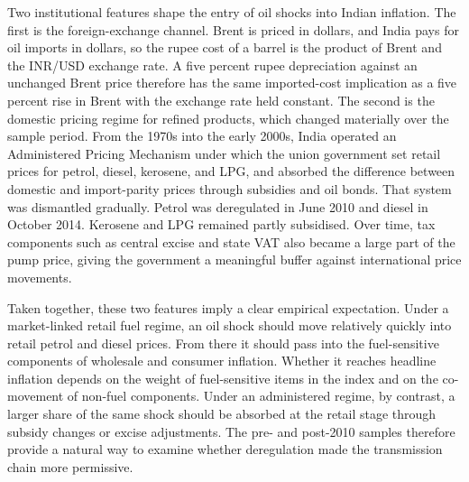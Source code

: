 \documentclass[11pt,a4paper]{article}
\begin{document}
Two institutional features shape the entry of oil shocks into Indian inflation. The first is the foreign-exchange channel. Brent is priced in dollars, and India pays for oil imports in dollars, so the rupee cost of a barrel is the product of Brent and the INR/USD exchange rate. A five percent rupee depreciation against an unchanged Brent price therefore has the same imported-cost implication as a five percent rise in Brent with the exchange rate held constant. The second is the domestic pricing regime for refined products, which changed materially over the sample period. From the 1970s into the early 2000s, India operated an Administered Pricing Mechanism under which the union government set retail prices for petrol, diesel, kerosene, and LPG, and absorbed the difference between domestic and import-parity prices through subsidies and oil bonds. That system was dismantled gradually. Petrol was deregulated in June 2010 and diesel in October 2014. Kerosene and LPG remained partly subsidised. Over time, tax components such as central excise and state VAT also became a large part of the pump price, giving the government a meaningful buffer against international price movements.

Taken together, these two features imply a clear empirical expectation. Under a market-linked retail fuel regime, an oil shock should move relatively quickly into retail petrol and diesel prices. From there it should pass into the fuel-sensitive components of wholesale and consumer inflation. Whether it reaches headline inflation depends on the weight of fuel-sensitive items in the index and on the co-movement of non-fuel components. Under an administered regime, by contrast, a larger share of the same shock should be absorbed at the retail stage through subsidy changes or excise adjustments. The pre- and post-2010 samples therefore provide a natural way to examine whether deregulation made the transmission chain more permissive.
\end{document}
